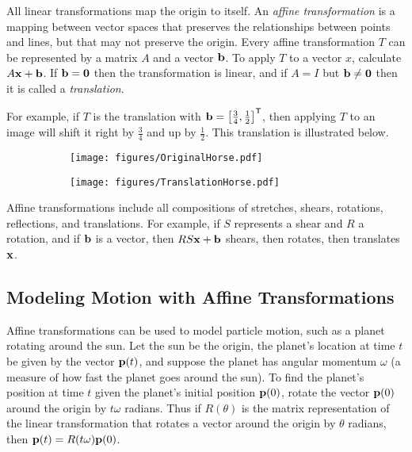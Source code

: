 All linear transformations map the origin to itself.
An \emph{affine transformation} is a mapping between vector spaces that preserves the relationships between points and lines, but that may not preserve the origin.
Every affine transformation $T$ can be represented by a matrix $A$ and a vector $\mathbf{b}$.
To apply $T$ to a vector $x$, calculate $A\mathbf{x} + \mathbf{b}$.
If $\mathbf{b} = \mathbf{0}$ then the transformation is linear, and if $A = I$ but $\mathbf{b}\neq\mathbf{0}$ then it is called a \emph{translation}.

For example, if $T$ is the translation with $\mathbf{b} = \left[\frac{3}{4}, \frac{1}{2}\right]^{\mathsf T}$, then applying $T$ to an image will shift it right by $\frac{3}{4}$ and up by $\frac{1}{2}$.
This translation is illustrated below.

\begin{figure}[H] %
\captionsetup[subfigure]{justification=centering}
\centering
\begin{subfigure}{.32\textwidth}
    \centering
    \texttt{[image: figures/OriginalHorse.pdf]}
\end{subfigure}%
\begin{subfigure}{.32\textwidth}
    \centering
    \texttt{[image: figures/TranslationHorse.pdf]}
\end{subfigure}
\end{figure}

Affine transformations include all compositions of stretches, shears, rotations, reflections, and translations.
For example, if $S$ represents a shear and $R$ a rotation, and if $\mathbf{b}$ is a vector, then $RS\mathbf{x} + \mathbf{b}$ shears, then rotates, then translates $\mathbf{x}$.

\subsection*{Modeling Motion with Affine Transformations} %

Affine transformations can be used to model particle motion, such as a planet rotating around the sun.
Let the sun be the origin, the planet's location at time $t$ be given by the vector $\mathbf{p}(t)$, and suppose the planet has angular momentum $\omega$ (a measure of how fast the planet goes around the sun).
To find the planet's position at time $t$ given the planet's initial position $\mathbf{p}(0)$, rotate the vector $\mathbf{p}(0)$ around the origin by $t\omega$ radians.
Thus if $R(\theta)$ is the matrix representation of the linear transformation that rotates a vector around the origin by $\theta$ radians, then $\mathbf{p}(t) = R(t\omega)\mathbf{p}(0)$.

